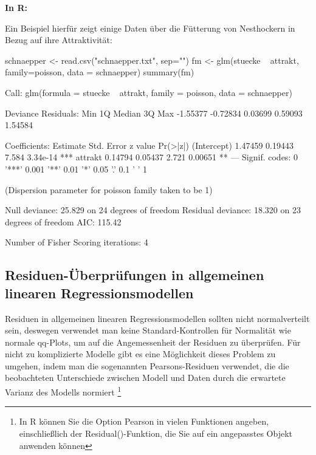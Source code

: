 \documentclass[a4paper,twoside]{tufte-book}\usepackage[]{graphicx}\usepackage[]{color}
\begin{document}
\vspace{1cm}
\begin{fullwidth}
\begin{mdframed}
    
\textbf{In R:} 

Ein Beispiel hierfür zeigt einige Daten über die Fütterung von Nesthockern in Bezug auf ihre Attraktivität:
\begin{Schunk}
\begin{Sinput}
schnaepper <- read.csv("schnaepper.txt", sep="")
fm <- glm(stuecke ~ attrakt, family=poisson, data = schnaepper)
summary(fm)
\end{Sinput}
\begin{Soutput}

Call:
glm(formula = stuecke ~ attrakt, family = poisson, data = schnaepper)

Deviance Residuals: 
     Min        1Q    Median        3Q       Max  
-1.55377  -0.72834   0.03699   0.59093   1.54584  

Coefficients:
            Estimate Std. Error z value Pr(>|z|)    
(Intercept)  1.47459    0.19443   7.584 3.34e-14 ***
attrakt      0.14794    0.05437   2.721  0.00651 ** 
---
Signif. codes:  0 '***' 0.001 '**' 0.01 '*' 0.05 '.' 0.1 ' ' 1

(Dispersion parameter for poisson family taken to be 1)

    Null deviance: 25.829  on 24  degrees of freedom
Residual deviance: 18.320  on 23  degrees of freedom
AIC: 115.42

Number of Fisher Scoring iterations: 4
\end{Soutput}
\end{Schunk}

\end{mdframed}
\end{fullwidth} 


\subsection{Residuen-Überprüfungen in allgemeinen linearen Regressionsmodellen}

Residuen in allgemeinen linearen Regressionsmodellen sollten nicht normalverteilt sein, deswegen verwendet man keine Standard-Kontrollen für Normalität wie normale qq-Plots, um auf die Angemessenheit der Residuen zu überprüfen. Für nicht zu komplizierte Modelle gibt es eine Möglichkeit dieses Problem zu umgehen, indem man die sogenannten Pearsons-Residuen verwendet, die die beobachteten Unterschiede zwischen Modell und Daten durch die erwartete Varianz des Modells normiert \footnote{In R können Sie die Option Pearson in vielen Funktionen angeben, einschließlich der Residual()-Funktion, die Sie auf ein angepasstes Objekt anwenden können}
\end{document}
